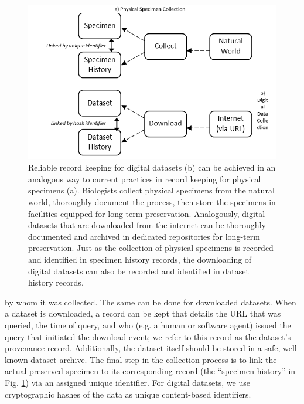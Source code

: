 \documentclass[10pt,letterpaper]{article}
\begin{document}
\begin{figure}[ht] %


\includegraphics[width=\textwidth]{fig1.png}

\caption{Reliable record keeping for digital datasets (b) can be achieved in an analogous way to current practices in record keeping for physical specimens (a). Biologists collect physical specimens from the natural world, thoroughly document the process, then store the specimens in facilities equipped for long-term preservation. Analogously, digital datasets that are downloaded from the internet can be thoroughly documented and archived in dedicated repositories for long-term preservation. Just as the collection of physical specimens is recorded and identified in specimen history records, the downloading of digital datasets can also be recorded and identified in dataset history records.}

\label{fig1} %

\end{figure}


by whom it was collected. The same can be done for downloaded datasets. When a dataset is downloaded, a record can be kept that details the URL that was queried, the time of query, and who (e.g. a human or software agent) issued the query that initiated the download event; we refer to this record as the dataset’s provenance record. Additionally, the dataset itself should be stored in a safe, well-known dataset archive. The final step in the collection process is to link the actual preserved specimen to its corresponding record (the “specimen history” in Fig. \ref{fig1}) via an assigned unique identifier. For digital datasets, we use cryptographic hashes of the data as unique content-based identifiers.
\end{document}

